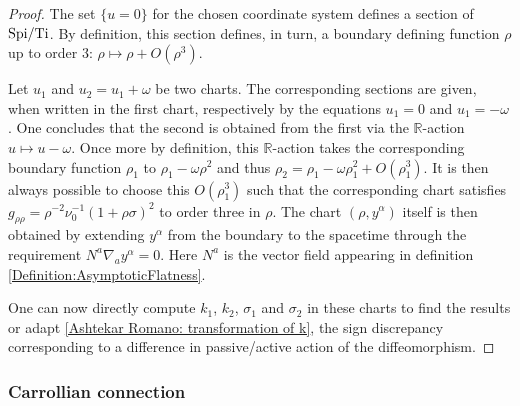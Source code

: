 \documentclass[a4paper, 10pt]{article}
\theoremstyle{remark}
\newcommand{\Ti}{\textnormal{Ti}}
\newcommand{\Spi}{\textnormal{Spi}}
\begin{document}
\begin{proof}\mbox{}

    The set $\{u=0\}$ for the chosen coordinate system defines a section of $\Spi/\Ti$. By definition, this section defines, in turn, a boundary defining function $\rho$ up to order 3: $\rho  \mapsto \rho  + O(\rho^3)$. 

    Let $u_1$ and $u_2 = u_1 +\omega$ be two charts. The corresponding sections are given, when written in the first chart, respectively by the equations $u_1=0$ and $u_1 = -\omega$. One concludes that the second is obtained from the first via the $\mathbb{R}$-action $u\mapsto u - \omega$. Once more by definition, this $\mathbb{R}$-action takes the corresponding boundary function $\rho_1$ to $\rho_1 - \omega \rho^2$ and thus $\rho_2 = \rho_1 - \omega \rho_1^2 + O(\rho_1^3)$. It is then always possible to choose this $O(\rho_1^3)$ such that the corresponding chart satisfies $g_{\rho\rho} = \rho^{-2}\nu_0^{-1}(1+ \rho \sigma)^2$ to order three in $\rho$. The chart $(\rho,y^{\alpha})$ itself is then obtained by extending $y^{\alpha}$ from the boundary to the spacetime through the requirement $N^a\nabla_a y^{\alpha} =0$. Here $N^a$ is the vector field appearing in definition \ref{Definition:AsymptoticFlatness}.

   One can now directly compute $k_1$, $k_2$, $\sigma_1$ and $\sigma_2$ in these charts to find the results or adapt \eqref{Ashtekar Romano: transformation of k}, the sign discrepancy corresponding to a difference in passive/active action of the diffeomorphism.
    
\end{proof}




\subsubsection{Carrollian connection}
\end{document}
